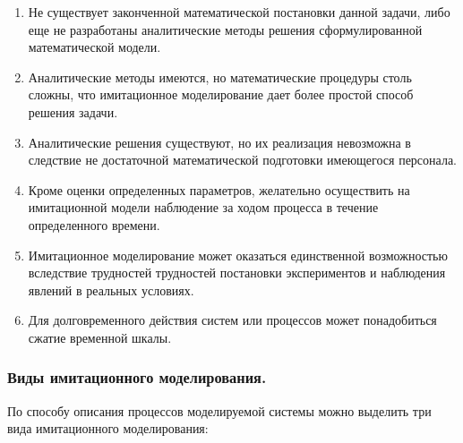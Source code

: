 \begin{enumerate}
    \item Не существует законченной математической постановки данной задачи, либо еще не разработаны аналитические методы решения сформулированной математической модели.
    \item Аналитические методы имеются, но математические процедуры столь сложны, что имитационное моделирование дает более простой способ решения задачи.
    \item Аналитические решения существуют, но их реализация невозможна в следствие не достаточной математической подготовки имеющегося персонала.
    \item Кроме оценки определенных параметров, желательно осуществить на имитационной модели наблюдение за ходом процесса в течение определенного времени.
    \item Имитационное моделирование может оказаться единственной возможностью вследствие трудностей трудностей постановки экспериментов и наблюдения явлений в реальных условиях.
    \item Для долговременного действия систем или процессов может понадобиться сжатие временной шкалы.
\end{enumerate}

\subsubsection{Виды имитационного моделирования.}

    По способу описания процессов моделируемой системы можно выделить три вида имитационного моделирования:

